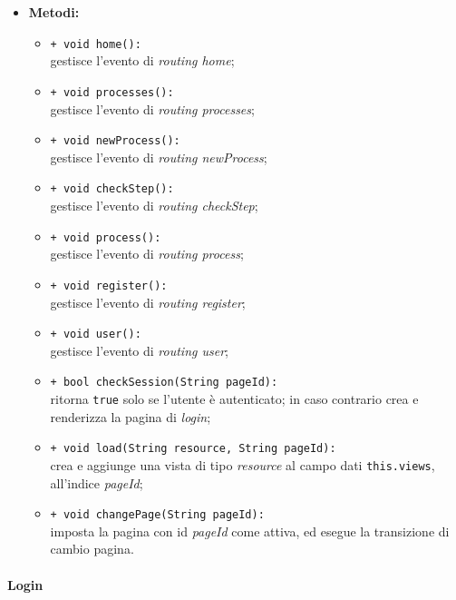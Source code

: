 \begin{flushleft}
\begin{itemize}
\begin{sloppypar}
\begin{itemize}
\end{itemize}
\end{sloppypar}
\item \textbf{Metodi:}
\begin{sloppypar}
\begin{itemize}
\item \texttt{+ void home():}\\ gestisce l'evento di \textit{routing home};
\item \texttt{+ void processes():}\\ gestisce l'evento di \textit{routing processes};
\item \texttt{+ void newProcess():}\\ gestisce l'evento di \textit{routing newProcess};
\item \texttt{+ void checkStep():}\\ gestisce l'evento di \textit{routing checkStep};
\item \texttt{+ void process():}\\ gestisce l'evento di \textit{routing process};
\item \texttt{+ void register():}\\ gestisce l'evento di \textit{routing register};
\item \texttt{+ void user():}\\ gestisce l'evento di \textit{routing user};
\item \texttt{+ bool checkSession(String pageId):}\\ ritorna \texttt{true} solo se l'utente è autenticato; in caso contrario crea e renderizza la pagina di \textit{login};
\item \texttt{+ void load(String resource, String pageId):}\\ crea e aggiunge una vista di tipo \textit{resource} al campo dati \texttt{this.views}, all'indice \textit{pageId};
\item \texttt{+ void changePage(String pageId):}\\ imposta la pagina con id \textit{pageId} come attiva, ed esegue la transizione di cambio pagina.
\end{itemize}
\end{sloppypar}
\end{itemize}
\end{flushleft}

\paragraph{Login}
\label{login}

